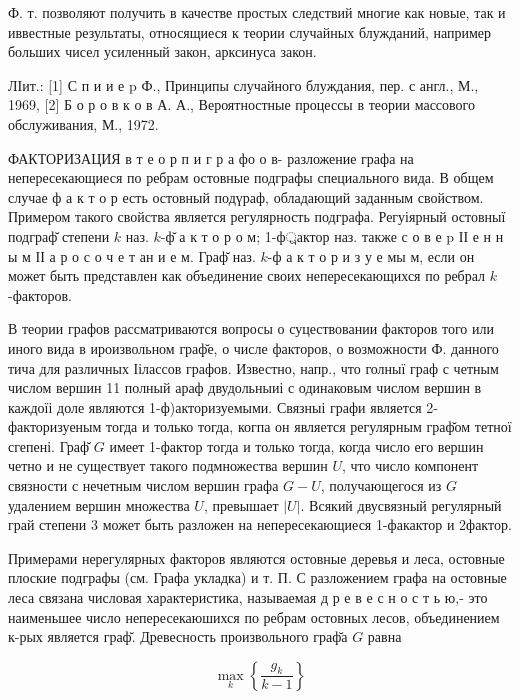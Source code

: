 \documentclass[10pt]{article}
\begin{document}
Ф. т. позволяют получить в качестве простых следствий многие как новые, так и иввестные результаты, относящиеся к теории случайных блужданий, например больших чисел усиленный закон, арксинуса закон.



ЛІит.: [1] С п и и е p Ф., Принципы случайного блуждания, пер. с англ., М., 1969, [2] Б о р о в к о в А. А., Вероятностные процессы в теории массового обслуживания, М., 1972.



ФАКТОРИЗАЦИЯ в т е о р п и г р а фо о в- разложение графа на непересекающиеся по ребрам остовные подграфы специального вида. В общем случае ф а к т о р есть остовный подүраф, обладающий заданным свойством. Примером такого свойства является регулярность подграфа. Регуіярный остовныї подграф̆ степени $k$ наз. $k$-ф̆ а к т о р о м; 1-ф্রактор наз. также с о в е p ІІ е н н ы м ІІ а р о с о ч е т ан и е м. Граф̆ наз. $k$-ф а к т о р и з у е мы м, если он может быть представлен как объединение своих непересекающихся по ребрал $k$-факторов.



В теории графов рассматриваются вопросы о суцествовании факторов того или иного вида в ироизвольном граф̆е, о числе факторов, о возможности Ф. данного тича для различных Іілассов графов. Известно, напр., что голныї граф с четным числом вершин 11 полный араф двудольныиі с одинаковым числом вершин в каждоїі доле являются 1-ф)акторизуемыми. Связныі графи является 2-факторизуеным тогда и только тогда, когпа он является регулярным граф̆ом тетної сгепені. Граф̆ $G$ имеет 1-фактор тогда и только тогда, когда число его вершин четно и не существует такого подмножества вершин $U$, что число компонент связности с нечетным числом вершин графа $G-U$, получающегося из $G$ удалением вершин множества $U$, превышает $|U|$. Всякий двусвязный регулярный грай степени 3 может быть разложен на непересекающиеся 1-факактор и 2фактор.



Примерами нерегулярных факторов являются остовные деревья и леса, остовные плоские подграфы (см. Графа укладка) и т. П. С разложением графа на остовные леса связана числовая характеристика, называемая д р е в е с н о с т ь ю,- это наименьшее число непересекаюшихся по ребрам остовных лесов, объединением к-рых является граф̆. Древесность произвольного граф̆а $G$ равна



\[

\max _{k}\left\{\frac{g_{k}}{k-1}\right\}

\]
\end{document}
